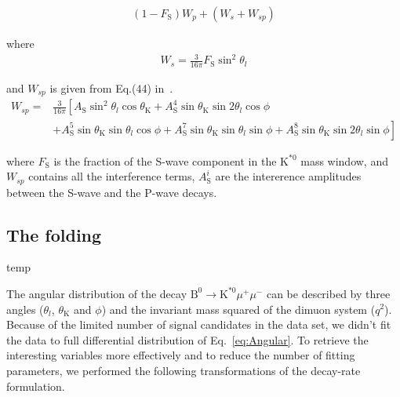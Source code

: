 \begin{equation} \label{eq:S-wave}
    \begin{split}
    (1-F_\mathrm{S})W_p + (W_s + W_{sp})
    \end{split}
\end{equation}

where 
\begin{equation} \label{eq:S-wave0}
    \begin{split}
      W_s = \frac{3}{16\pi} F_\mathrm{S}\sin^2\theta_l
    \end{split}
\end{equation}

and $W_{sp}$ is given from Eq.(44) in~\cite{Genon:Swave}. 
\begin{equation} \label{eq:S-wave1}
    \begin{split}
      W_{sp}= &\frac{3}{16 \pi}\left[ A_\mathrm{S}\sin^2\theta_l\cos\theta_\mathrm{K}+ A_\mathrm{S}^4\sin\theta_\mathrm{K}\sin2\theta_l\cos\phi\right.\\
            &+\left.A^5_\mathrm{S}\sin\theta_\mathrm{K}\sin\theta_l\cos\phi+A_\mathrm{S}^7\sin\theta_\mathrm{K}\sin\theta_l\sin\phi+A_\mathrm{S}^8\sin\theta_\mathrm{K}\sin2\theta_l\sin\phi\right]
    \end{split}
\end{equation}

where $F_\mathrm{S}$ is the fraction of the S-wave component in the
$\text{K}^{*0}$ mass window, and $W_{sp}$ contains all the
interference terms, $A_\mathrm{S}^i$ are the intererence amplitudes between the
S-wave and the P-wave decays\cite{Genon:Swave}.


\subsection{The \pdf folding}
\label{sec:folding}

temp


The angular distribution of the decay
$\text{B}^0 \rightarrow \text{K}^{*0} \mu^+ \mu^-$ can be described by
three angles ($\theta_l $, $\theta_\mathrm{K} $ and $\phi$) and the
invariant mass squared of the dimuon system ($q^2$). Because of the
limited number of signal candidates in the data set, we didn't fit the
data to full differential distribution of Eq.~\ref{eq:Angular}. To
retrieve the interesting variables more effectively and to reduce the
number of fitting parameters, we performed the following transformations of the
decay-rate formulation.


